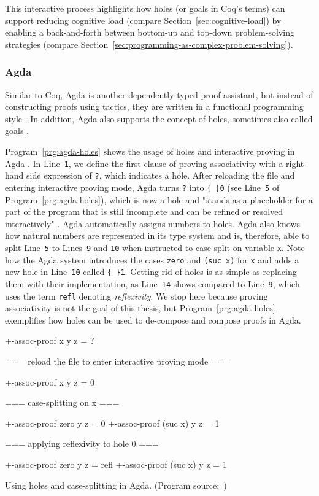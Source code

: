 This interactive process highlights how holes (or goals in Coq's terms) can support reducing cognitive load (compare Section~\ref{sec:cognitive-load}) by enabling a back-and-forth between bottom-up and top-down problem-solving strategies (compare Section~\ref{sec:programming-as-complex-problem-solving}).

\subsubsection{Agda}
Similar to Coq, Agda is another dependently typed proof assistant, but instead of constructing proofs using tactics, they are written in a functional programming style \cite{knispel_agda_2020}.
In addition, Agda also supports the concept of holes, sometimes also called goals \cite{the_agda_team_holes_2023}.

Program~\ref{prg:agda-holes} shows the usage of holes and interactive proving in Agda \cite{the_agda_team_holes_2023}.
In Line~\verb|1|, we define the first clause of proving associativity with a right-hand side expression of \verb|?|, which indicates a hole.
After reloading the file and entering interactive proving mode, Agda turns \verb|?| into \verb|{ }0| (see Line~\verb|5| of Program~\ref{prg:agda-holes}), which is now a hole and "stands as a placeholder for a part of the program that is still incomplete and can be refined or resolved interactively" \cite{the_agda_team_holes_2023}.
Agda automatically assigns numbers to holes.
Agda also knows how natural numbers are represented in its type system and is, therefore, able to split Line~\verb|5| to Lines~\verb|9| and \verb|10| when instructed to case-split on variable \verb|x|.
Note how the Agda system introduces the cases \verb|zero| and \verb|(suc x)| for \verb|x| and adds a new hole in Line~\verb|10| called \verb|{ }1|.
Getting rid of holes is as simple as replacing them with their implementation, as Line~\verb|14| shows compared to Line~\verb|9|, which uses the term \verb|refl| denoting \emph{reflexivity}.
We stop here because proving associativity is not the goal of this thesis, but Program~\ref{prg:agda-holes} exemplifies how holes can be used to de-compose and compose proofs in Agda.

\begin{program}[ht]
\begin{GenericCode}
+-assoc-proof x y z = ?

=== reload the file to enter interactive proving mode ===

+-assoc-proof x y z = { }0

=== case-splitting on x ===

+-assoc-proof zero y z = {  }0
+-assoc-proof (suc x) y z = {  }1

=== applying reflexivity to hole 0 ===

+-assoc-proof zero y z = refl
+-assoc-proof (suc x) y z = {  }1
\end{GenericCode}
\caption{Using holes and case-splitting in Agda. (Program source:~\cite{the_agda_team_holes_2023})}
\label{prg:agda-holes}
\end{program}

